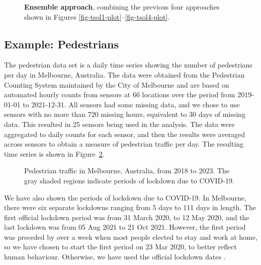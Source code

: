 \documentclass[
  11pt,
  a4paper,
]{article}
\begin{document}
\begin{figure}[!t]


\caption{\label{fig-tensemble-plot}\textbf{Ensemble approach}, combining
the previous four approaches shown in Figures
\ref{fig-tsol1-plot}--\ref{fig-tsol4-plot}.}

\end{figure}%

\FloatBarrier

\subsection{Example: Pedestrians}\label{example-pedestrians}

The pedestrian data set is a daily time series showing the number of
pedestrians per day in Melbourne, Australia. The data were obtained from
the Pedestrian Counting System maintained by the City of Melbourne
\autocite{pedestrians} and are based on automated hourly counts from
sensors at 66 locations over the period from 2019-01-01 to 2021-12-31.
All sensors had some missing data, and we chose to use sensors with no
more than 720 missing hours, equivalent to 30 days of missing data. This
resulted in 25 sensors being used in the analysis. The data were
aggregated to daily counts for each sensor, and then the results were
averaged across sensors to obtain a measure of pedestrian traffic per
day. The resulting time series is shown in Figure~\ref{fig-walkers}.

\begin{figure}


\caption{\label{fig-walkers}Pedestrian traffic in Melbourne, Australia,
from 2018 to 2023. The gray shaded regions indicate periods of lockdown
due to COVID-19.}

\end{figure}%

We have also shown the periods of lockdown due to COVID-19. In
Melbourne, there were six separate lockdowns ranging from 5 days to 111
days in length. The first official lockdown period was from 31 March
2020, to 12 May 2020, and the last lockdown was from 05 Aug 2021 to 21
Oct 2021. However, the first period was preceded by over a week when
most people elected to stay and work at home, so we have chosen to start
the first period on 23 Mar 2020, to better reflect human behaviour.
Otherwise, we have used the official lockdown dates
\autocite{MelbourneLockdowns}.
\end{document}
